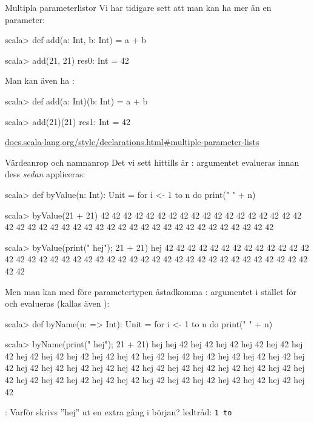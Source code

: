 \begin{Slide}{Multipla parameterlistor}
Vi har tidigare sett att man kan ha mer än en parameter:
\begin{REPLnonum}
scala> def add(a: Int, b: Int) = a + b

scala> add(21, 21)
res0: Int = 42
\end{REPLnonum}
Man kan även ha  :
\begin{REPLnonum}
scala> def add(a: Int)(b: Int) = a + b

scala> add(21)(21)
res1: Int = 42
\end{REPLnonum}

\href{http://docs.scala-lang.org/style/declarations.html#multiple-parameter-lists}{\SlideFontTiny docs.scala-lang.org/style/declarations.html\#multiple-parameter-lists}
\end{Slide}



\begin{Slide}{Värdeanrop och namnanrop}\SlideFontSmall
Det vi sett hittills är : argumentet evalueras  innan dess  \emph{sedan} appliceras:
\begin{REPL}
scala> def byValue(n: Int): Unit = for i <- 1 to n do print(" " + n)

scala> byValue(21 + 21)
 42 42 42 42 42 42 42 42 42 42 42 42 42 42 42 42 42 42 42 42 42 42 42 42 42 42 42 42 42 42 42 42 42 42 42 42 42 42 42 42 42 42

scala> byValue({print(" hej"); 21 + 21})
 hej 42 42 42 42 42 42 42 42 42 42 42 42 42 42 42 42 42 42 42 42 42 42 42 42 42 42 42 42 42 42 42 42 42 42 42 42 42 42 42 42 42 42
\end{REPL}
\pause
Men man kan med \code{=>} före parametertypen åstadkomma : argumentet  i stället för  och evalueras  (kallas även ):
\begin{REPL}
scala> def byName(n: => Int): Unit = for i <- 1 to n do print(" " + n)

scala> byName({print(" hej"); 21 + 21})
 hej hej 42 hej 42 hej 42 hej 42 hej 42 hej 42 hej 42 hej 42 hej 42 hej 42 hej 42 hej 42 hej 42 hej 42 hej 42 hej 42 hej 42 hej 42 hej 42 hej 42 hej 42 hej 42 hej 42 hej 42 hej 42 hej 42 hej 42 hej 42 hej 42 hej 42 hej 42 hej 42 hej 42 hej 42 hej 42 hej 42 hej 42 hej 42 hej 42 hej 42 hej 42 hej 42
\end{REPL}
: Varför skrivs ''hej'' ut en extra gång i början? \pause ledtråd: \texttt{1 to }
\end{Slide}

